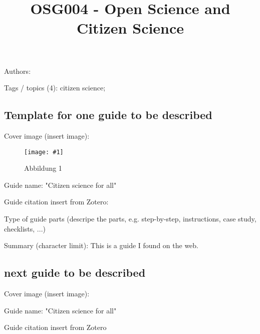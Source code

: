 \documentclass{article}
\newlength{\imgwidth}
\newcommand\scaledgraphics[2]{%
                
\settowidth{\imgwidth}{\texttt{[image: \#1]}}%
                
\setlength{\imgwidth}{\minof{\imgwidth}{#2\textwidth}}%
                
\texttt{[image: \#1]}%
                
}
\begin{document}
\title{OSG004 - Open Science and Citizen Science}

\maketitle


Authors: 


Tags / topics (4): citizen science; 


\subsection{Template for one guide to be described}\label{H7151279}



Cover image (insert image): 


\begin{center}
\begin{figure}
\scaledgraphics{2decc25d-9faa-4f12-8b5b-f43d663b02d7.jpg}{0.5}
\caption*{Abbildung 1}\label{F41123511}
\end{figure}


\end{center}


Guide name: "Citizen science for all"


Guide citation insert from Zotero: \autocite{noauthor_citizen_2016}\autocite{pocock_choosing_2014}


Type of guide parts (descripe the parts, e.g. step-by-step, instructions, case study, checklists, ...)


Summary (character limit): This is a guide I found on the web. \autocite{noauthor_citizen_2016}


\subsection{next guide to be described}\label{H7212092}



Cover image (insert image):


Guide name: "Citizen science for all"


Guide citation insert from Zotero \autocite{pocock_choosing_2014}  


\printbibliography[title={Literaturverzeichnis}]
\end{document}
